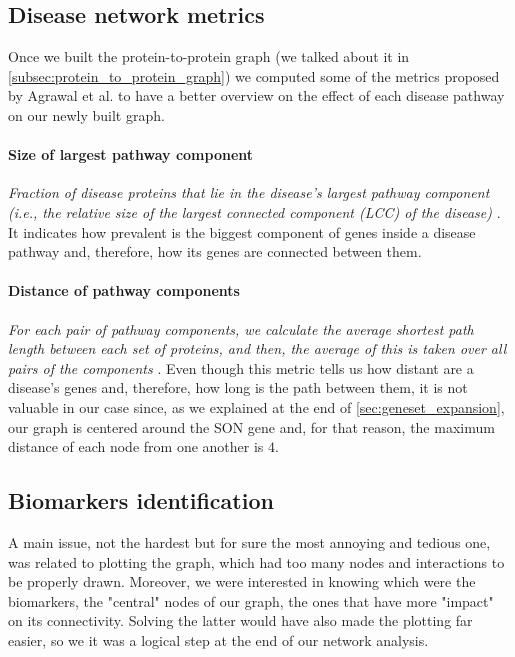 \subsection{Disease network metrics}\label{subsec:disease_metrics}
Once we built the protein-to-protein graph (we talked about it in \autoref{subsec:protein_to_protein_graph}) we computed some of the metrics proposed by Agrawal et al. \cite{agrawal2018} to have a better overview on the effect of each disease pathway on our newly built graph.
\paragraph{Size of largest pathway component} \textit{Fraction of disease proteins that lie in the disease's largest pathway component (i.e., the relative size of the largest connected component (LCC) of the disease)} \cite{agrawal2018}. It indicates how prevalent is the biggest component of genes inside a disease pathway and, therefore, how its genes are connected between them.
\paragraph{Distance of pathway components} \textit{For each pair of pathway components, we calculate the average shortest path length between each set of proteins, and then, the average of this is taken over all pairs of the components} \cite{agrawal2018}. Even though this metric tells us how distant are a disease's genes and, therefore, how long is the path between them, it is not valuable in our case since, as we explained at the end of \autoref{sec:geneset_expansion}, our graph is centered around the SON gene and, for that reason, the maximum distance of each node from one another is $4$.

\subsection{Biomarkers identification}\label{subsec:biomarkers}
A main issue, not the hardest but for sure the most annoying and tedious one, was related to plotting the graph, which had too many nodes and interactions to be properly drawn. Moreover, we were interested in knowing which were the biomarkers, the "central" nodes of our graph, the ones that have more "impact" on its connectivity. Solving the latter would have also made the plotting far easier, so we it was a logical step at the end of our network analysis.
\vspace{3mm}

